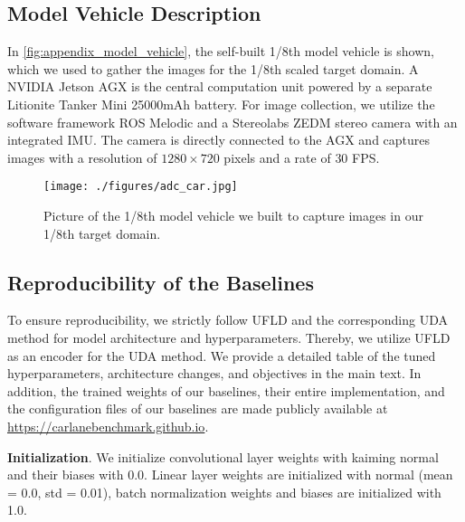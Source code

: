 \documentclass{article}
\begin{document}
\subsection{Model Vehicle Description}
In \autoref{fig:appendix_model_vehicle}, the self-built 1/8th model vehicle is shown, which we used to gather the images for the 1/8th scaled target domain. A NVIDIA Jetson AGX is the central computation unit powered by a separate Litionite Tanker Mini 25000mAh battery. For image collection, we utilize the software framework ROS Melodic and a Stereolabs ZEDM stereo camera with an integrated IMU. The camera is directly connected to the AGX and captures images with a resolution of $1280 \times 720$ pixels and a rate of $30$ FPS.

\begin{figure}[ht]
	\centering
	\texttt{[image: ./figures/adc\_car.jpg]}
	\caption{Picture of the 1/8th model vehicle we built to capture images in our 1/8th target domain.} 
	\label{fig:appendix_model_vehicle}
\end{figure}

\subsection{Reproducibility of the Baselines}
To ensure reproducibility, we strictly follow UFLD \cite{qin2020ultra} and the corresponding UDA method for model architecture and hyperparameters. Thereby, we utilize UFLD as an encoder for the UDA method. We provide a detailed table of the tuned hyperparameters, architecture changes, and objectives in the main text. In addition, the trained weights of our baselines, their entire implementation, and the configuration files of our baselines are made publicly available at \href{https://carlanebenchmark.github.io}{https://carlanebenchmark.github.io}. 

\textbf{Initialization}. We initialize convolutional layer weights with kaiming normal and their biases with 0.0. Linear layer weights are initialized with normal (mean = 0.0, std = 0.01), batch normalization weights and biases are initialized with 1.0.
\end{document}
